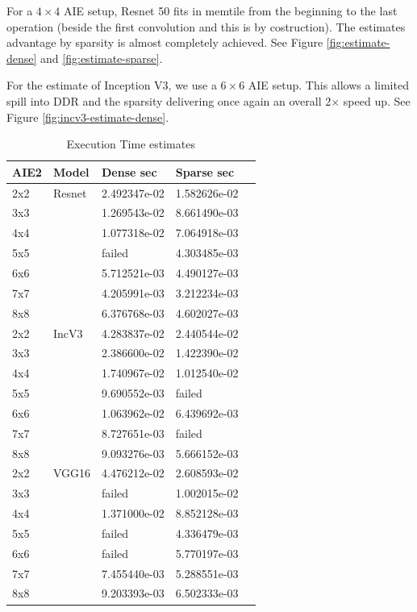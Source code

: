 \documentclass[conference]{IEEEtran}
\begin{document}
For a $4\times 4$ AIE setup, Resnet 50 fits in memtile from the
beginning to the last operation (beside the first convolution and this
is by costruction). The estimates advantage by sparsity is almost
completely achieved.  See Figure \ref{fig:estimate-dense} and
\ref{fig:estimate-sparse}.

For the estimate of Inception V3, we use a $6\times 6$ AIE setup.
This allows a limited spill into DDR and the sparsity delivering once
again an overall 2$\times$ speed up. See Figure
\ref{fig:incv3-estimate-dense}.




\begin{table}[htb]
  \caption{Execution Time estimates}
  \label{tab_perf}
\begin{center} 
\begin{tabular}{|l|l|l|l|l|}
  \hline
  AIE2 & Model  & Dense sec      & Sparse sec      \\ \hline\hline
  2x2   & Resnet & 2.492347e-02  & 1.582626e-02 \\ \hline
  3x3   &  & 1.269543e-02  & 8.661490e-03 \\ \hline
  4x4   &  &  1.077318e-02 & 7.064918e-03 \\ \hline
  5x5   &  &  failed       & 4.303485e-03 \\ \hline
  6x6   &  &  5.712521e-03 & 4.490127e-03 \\ \hline
  7x7   &  &  4.205991e-03 & 3.212234e-03 \\ \hline
  8x8   &  &  6.376768e-03 & 4.602027e-03 \\ \hline \hline
  2x2   & IncV3  & 4.283837e-02  & 2.440544e-02 \\ \hline
  3x3   &   & 2.386600e-02  & 1.422390e-02 \\ \hline
  4x4   &   &  1.740967e-02 & 1.012540e-02 \\ \hline
  5x5   &   &  9.690552e-03 & failed       \\ \hline
  6x6   &   &  1.063962e-02 & 6.439692e-03 \\ \hline
  7x7   &   &  8.727651e-03 & failed       \\ \hline
  8x8   &   &  9.093276e-03 & 5.666152e-03 \\ \hline \hline
  2x2   & VGG16  & 4.476212e-02  & 2.608593e-02 \\ \hline
  3x3   &   & failed        & 1.002015e-02 \\ \hline
  4x4   &   &  1.371000e-02 & 8.852128e-03 \\ \hline
  5x5   &   &  failed       & 4.336479e-03 \\ \hline
  6x6   &   &  failed       & 5.770197e-03 \\ \hline
  7x7   &   &  7.455440e-03 & 5.288551e-03 \\ \hline
  8x8   &   &  9.203393e-03 & 6.502333e-03 \\ \hline \hline
          
\end{tabular}
\end{center}
\end{table}
\end{document}
